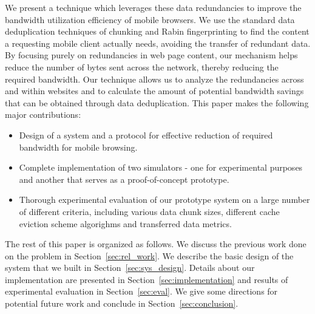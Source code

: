 We present a technique which leverages these data redundancies to improve the bandwidth utilization efficiency of mobile browsers. We use the standard data deduplication 
techniques of chunking \cite{manber,spring,lbfs} and Rabin fingerprinting \cite{rabin} to find the content a requesting mobile client actually needs, avoiding the transfer of redundant data. By focusing purely on redundancies in web 
page content, our mechanism helps reduce the number of bytes sent across the network, thereby reducing the required bandwidth. Our technique allows us to analyze 
the redundancies across and within websites and to calculate the amount of potential bandwidth savings that can be obtained through data deduplication. This paper 
makes the following major contributions:
\begin{itemize}
\item Design of a system and a protocol for effective reduction of required bandwidth for mobile browsing.
\item Complete implementation of two simulators - one for experimental purposes and another that serves as a proof-of-concept prototype.
\item Thorough experimental evaluation of our prototype system on a large number of different criteria, including various data chunk sizes, different cache eviction scheme
algorighms and transferred data metrics.
\end{itemize}

The rest of this paper is organized as follows. We discuss the previous work done on the problem in Section~\ref{sec:rel_work}. We describe the basic design of the 
system that we built in Section~\ref{sec:sys_design}. Details about our implementation are presented in Section~\ref{sec:implementation} 
and results of experimental evaluation in Section~\ref{sec:eval}. We 
give some directions for potential future work and conclude in Section~\ref{sec:conclusion}.
